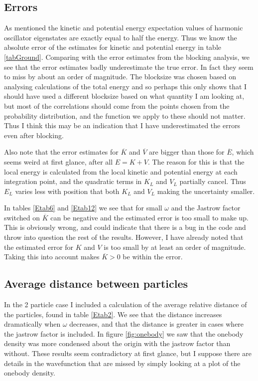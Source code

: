 \documentclass[a4paper,English,10pt]{article}
\renewcommand{\bar}{\overline}
\begin{document}
\subsection{Errors}
As mentioned the kinetic and potential energy expectation values of harmonic oscillator eigenstates are exactly equal to half the energy.
Thus we know the absolute error of the estimates for kinetic and potential energy in table \ref{tabGround}. Comparing with the error estimates from the blocking analysis,
we see that the error estimates badly underestimate the true error. In fact they seem to miss by about an order of magnitude. The blocksize was chosen based on analysing calculations
of the total energy and so perhaps this only shows that I should have used a different blocksize based on what quantity I am looking at, but most of the correlations
should come from the points chosen from the probability distribution, and the function we apply to these should not matter. Thus I think this may be an indication that I have
underestimated the errors even after blocking.

Also note that the error estimates for $\bar{K}$ and $\bar{V}$ are bigger than those for $\bar{E}$, which seems weird at first glance, after all $E = K + V$.
The reason for this is that the local energy is calculated from the local kinetic and potential energy at each integration point, and the quadratic terms in $K_L$
and $V_L$ partially cancel. Thus $E_L$ varies less with position that both $K_L$ and $V_L$ making the uncertainty smaller.

In tables \ref{Etab6} and \ref{Etab12} we see that for small $\omega$ and the Jastrow factor switched on $\bar{K}$ can be negative and the estimated error is too small to make up.
This is obviously wrong, and could indicate that there is a bug in the code and throw into question the rest of the results. However, I have already noted that the estimated error
for $K$ and $V$ is too small by at least an order of magnitude. Taking this into account makes $\bar{K} > 0$ be within the error. 

\subsection{Average distance between particles}
In the 2 particle case I included a calculation of the average relative distance of the particles, found in table \ref{Etab2}.
We see that the distance increases dramatically when $\omega$ decreases, and that the distance is greater in cases where the jastrow factor is included.
In figure \ref{fig:onebody} we saw that the onebody density was more condensed about the origin with the jastrow factor than without. These results seem
contradictory at first glance, but I suppose there are details in the wavefunction that are missed by simply looking at a plot of the onebody density.
\end{document}
